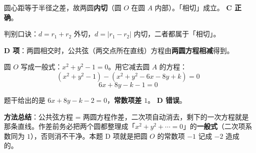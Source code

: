 \begin{answer}
圆心距等于半径之差，故两圆\textbf{内切}（圆 $O$ 在圆 $A$ 内部）。「相切」成立。 \textbf{C 正确}。

\begin{gktip}
判别口诀：$d=r_1+r_2$ 外切，$d=\left|r_1-r_2\right|$ 内切，二者都属于「相切」。
\end{gktip}

\par\medskip

\textbf{D 项}：两圆相交时，公共弦（两交点所在直线）方程由\textbf{两圆方程相减}得到。

圆 $O$ 写成一般式：$x^2+y^2-1=0$。用它减去圆 $A$ 的方程：
\nopagebreak[4]
\[\left(x^2+y^2-1\right)-\left(x^2+y^2-6x-8y+k\right)=0\]
\nopagebreak[4]
\[6x+8y-k-1=0\]

题干给出的是 $6x+8y-k-2=0$，\textbf{常数项差 $1$}。 \textbf{D 错误}。

\begin{gktip}
\textbf{方法总结}：公共弦方程 = 两圆方程作差，二次项自动消去，剩下的一次方程就是那条直线。作差前务必把两个圆都整理成「$x^2+y^2+\cdots=0$」的\textbf{一般式}（二次项系数同为 $1$），否则消不干净。本题 D 项就是把圆 $O$ 的常数项 $-1$ 记成 $-2$ 造成的。
\end{gktip}


\par\medskip

\end{answer}
